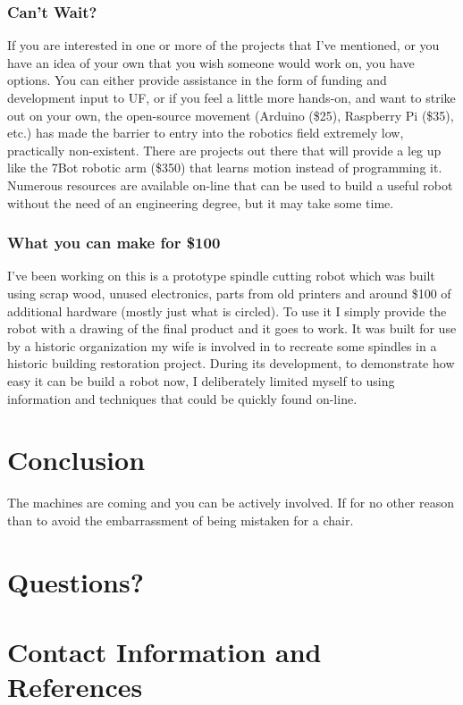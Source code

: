 \documentclass[12pt]{article}
\begin{document}
\subsubsection{Can't Wait?}
If you are interested in one or more of the projects that I've mentioned, or you have an idea of your own that you wish someone would work on, you have options.  You can either provide assistance in the form of funding and development input to UF, or if you feel a little more hands-on, and want to strike out on your own, the open-source movement (Arduino (\$25), Raspberry Pi (\$35), etc.) has made the barrier to entry into the robotics field extremely low, practically non-existent.  There are projects out there that will provide a leg up like the 7Bot robotic arm (\$350) that learns motion instead of programming it.  Numerous resources are available on-line that can be used to build a useful robot without the need of an engineering degree, but it may take some time.
\subsubsection{What you can make for \$100}
I've been working on this is a prototype spindle cutting robot which was built using scrap wood, unused electronics, parts from old printers and around \$100 of additional hardware (mostly just what is circled).  To use it I simply provide the robot with a drawing of the final product and it goes to work.  It was built for use by a historic organization my wife is involved in to recreate some spindles in a historic building restoration project.  During its development, to demonstrate how easy it can be build a robot now, I deliberately limited myself to using information and techniques that could be quickly found on-line.  
\section{Conclusion}
The machines are coming and you can be actively involved.  If for no other reason than to avoid the embarrassment of being mistaken for a chair.
\section{Questions?}

\section{Contact Information and References}
\end{document}
